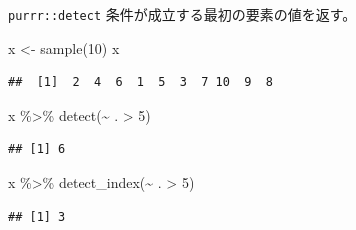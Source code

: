 \documentclass[
  ignorenonframetext,
  aspectratio=169]{beamer}
\newenvironment{Shaded}{\begin{snugshade}}{\end{snugshade}}
\newcommand{\DecValTok}[1]{\textcolor[rgb]{0.00,0.00,0.81}{#1}}
\newcommand{\FunctionTok}[1]{\textcolor[rgb]{0.00,0.00,0.00}{#1}}
\newcommand{\NormalTok}[1]{#1}
\newcommand{\OtherTok}[1]{\textcolor[rgb]{0.56,0.35,0.01}{#1}}
\newcommand{\SpecialCharTok}[1]{\textcolor[rgb]{0.00,0.00,0.00}{#1}}
\begin{document}
\begin{frame}[fragile]{\texttt{purrr::detect}}
\protect\hypertarget{purrrdetect}{}
条件が成立する最初の要素の値を返す。

\begin{Shaded}
\begin{Highlighting}[]
\NormalTok{x }\OtherTok{\textless{}{-}} \FunctionTok{sample}\NormalTok{(}\DecValTok{10}\NormalTok{)}
\NormalTok{x}
\end{Highlighting}
\end{Shaded}

\begin{verbatim}
##  [1]  2  4  6  1  5  3  7 10  9  8
\end{verbatim}

\begin{Shaded}
\begin{Highlighting}[]
\NormalTok{x }\SpecialCharTok{\%\textgreater{}\%} \FunctionTok{detect}\NormalTok{(}\SpecialCharTok{\textasciitilde{}}\NormalTok{ . }\SpecialCharTok{\textgreater{}} \DecValTok{5}\NormalTok{)}
\end{Highlighting}
\end{Shaded}

\begin{verbatim}
## [1] 6
\end{verbatim}

\begin{Shaded}
\begin{Highlighting}[]
\NormalTok{x }\SpecialCharTok{\%\textgreater{}\%} \FunctionTok{detect\_index}\NormalTok{(}\SpecialCharTok{\textasciitilde{}}\NormalTok{ . }\SpecialCharTok{\textgreater{}} \DecValTok{5}\NormalTok{)}
\end{Highlighting}
\end{Shaded}

\begin{verbatim}
## [1] 3
\end{verbatim}
\end{frame}
\end{document}

